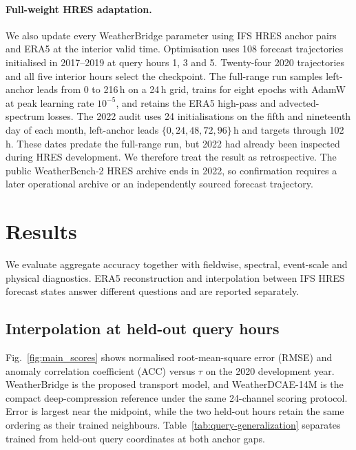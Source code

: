 \documentclass[referee,lineno,pdflatex,sn-nature]{sn-jnl}
\begin{document}
\begin{deferredmethodsrest}
\paragraph{Full-weight HRES adaptation.}
We also update every WeatherBridge parameter using IFS HRES anchor pairs and
ERA5 at the interior valid time. Optimisation uses 108 forecast trajectories
initialised in 2017--2019 at query hours 1, 3 and 5. Twenty-four 2020
trajectories and all five interior hours select the checkpoint. The full-range
run samples left-anchor leads from 0 to 216\,h on a 24\,h grid, trains for eight
epochs with AdamW at peak learning rate $10^{-5}$, and retains the ERA5
high-pass and advected-spectrum losses. The 2022 audit uses 24
initialisations on the fifth and nineteenth day of each month, left-anchor
leads $\{0,24,48,72,96\}$\,h and targets through 102\,h. These dates predate
the full-range run, but 2022 had already been inspected during HRES
development. We therefore treat the result as retrospective. The public
WeatherBench-2 HRES archive ends in 2022, so confirmation requires a later
operational archive or an independently sourced forecast trajectory.

\FloatBarrier

\end{deferredmethodsrest}

\section{Results}
\label{sec:results}

We evaluate aggregate accuracy together with fieldwise, spectral, event-scale
and physical diagnostics. ERA5 reconstruction and interpolation between IFS
HRES forecast states answer different questions and are reported separately.

\subsection{Interpolation at held-out query hours}

Fig.~\ref{fig:main_scores} shows normalised root-mean-square error (RMSE) and
anomaly correlation coefficient (ACC) versus $\tau$ on
the 2020 development year. WeatherBridge is the proposed
transport model, and WeatherDCAE-14M is the compact deep-compression reference
under the same 24-channel scoring protocol. Error is largest near the
midpoint, while the two held-out hours retain the same ordering as their
trained neighbours. Table~\ref{tab:query-generalization} separates trained
from held-out query coordinates at both anchor gaps.
\end{document}
